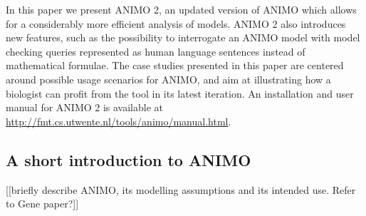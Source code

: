 \documentclass{bmcart}
\def\tas{Timed Automata}
\def\animo2{ANIMO 2}
\begin{document}


In this paper we present \animo2{}, an updated version of ANIMO which allows for a considerably
more efficient analysis of models. \animo2{} also introduces new features, such as the possibility to interrogate
an ANIMO model with model checking queries represented as human language sentences instead of
mathematical formulae. The case studies presented in this paper are centered around possible usage scenarios
for ANIMO, and aim at illustrating how a biologist can profit from the tool in its latest iteration.
An installation and user manual for \animo2{} is available at \url{http://fmt.cs.utwente.nl/tools/animo/manual.html}.

\subsection*{A short introduction to ANIMO}
{\Large [[briefly describe ANIMO, its modelling assumptions and its intended use. Refer to Gene paper?]]}
\end{document}
